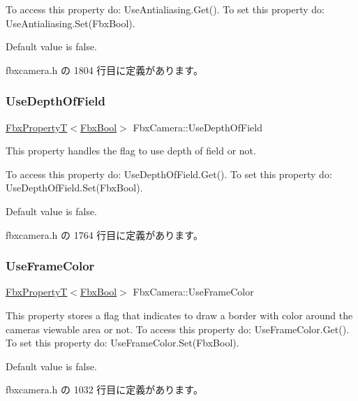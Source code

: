 To access this property do\+: Use\+Antialiasing.\+Get(). To set this property do\+: Use\+Antialiasing.\+Set(\+Fbx\+Bool).

Default value is false. 

 fbxcamera.\+h の 1804 行目に定義があります。

\mbox{\label{class_fbx_camera_a5b101aeb02696ef3e140505f01e6f797}} 
\subsubsection{\texorpdfstring{Use\+Depth\+Of\+Field}{UseDepthOfField}}
{\footnotesize\ttfamily \hyperlink{class_fbx_property_t}{Fbx\+PropertyT}$<$\hyperlink{fbxtypes_8h_a92e0562b2fe33e76a242f498b362262e}{Fbx\+Bool}$>$ Fbx\+Camera\+::\+Use\+Depth\+Of\+Field}

This property handles the flag to use depth of field or not.

To access this property do\+: Use\+Depth\+Of\+Field.\+Get(). To set this property do\+: Use\+Depth\+Of\+Field.\+Set(\+Fbx\+Bool).

Default value is false. 

 fbxcamera.\+h の 1764 行目に定義があります。

\mbox{\label{class_fbx_camera_a891e6eb1c91dd3a47dc05547149825e3}} 
\subsubsection{\texorpdfstring{Use\+Frame\+Color}{UseFrameColor}}
{\footnotesize\ttfamily \hyperlink{class_fbx_property_t}{Fbx\+PropertyT}$<$\hyperlink{fbxtypes_8h_a92e0562b2fe33e76a242f498b362262e}{Fbx\+Bool}$>$ Fbx\+Camera\+::\+Use\+Frame\+Color}

This property stores a flag that indicates to draw a border with color around the camera\textquotesingle{}s viewable area or not. To access this property do\+: Use\+Frame\+Color.\+Get(). To set this property do\+: Use\+Frame\+Color.\+Set(\+Fbx\+Bool).

Default value is false. 

 fbxcamera.\+h の 1032 行目に定義があります。

